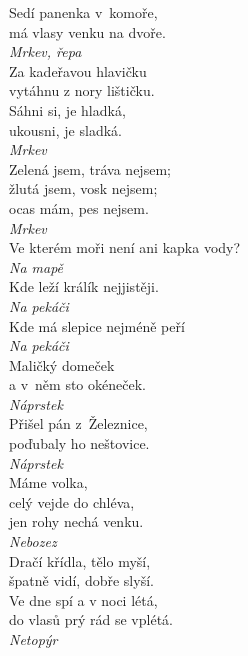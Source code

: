 \begin{multicols}{\value{columnsthindata}}
\noindent
Sedí panenka v~komoře,\\
má vlasy venku na dvoře.\\[1 mm]
{\sl Mrkev, řepa}\\

\noindent
Za kadeřavou hlavičku\\
vytáhnu z nory lištičku.\\
Sáhni si, je hladká,\\
ukousni, je sladká.\\[1 mm]
{\sl Mrkev}\\

\noindent
Zelená jsem, tráva nejsem;\\
žlutá jsem, vosk nejsem;\\
ocas mám, pes nejsem.\\[1 mm]
{\sl Mrkev}\\

\noindent
Ve kterém moři není ani kapka vody?\\[1 mm]
{\sl Na mapě}\\

\noindent
Kde leží králík nejjistěji.\\[1 mm]
{\sl Na pekáči}\\

\noindent
Kde má slepice nejméně peří\\[1 mm]
{\sl Na pekáči}\\

\noindent
Maličký domeček\\
a v~něm sto okéneček.\\[1 mm]
{\sl Náprstek}\\

\noindent
Přišel pán z~Železnice,\\
poďubaly ho neštovice.\\[1 mm]
{\sl Náprstek}\\

\noindent
Máme volka,\\
celý vejde do chléva,\\
jen rohy nechá venku.\\[1 mm]
{\sl Nebozez}\\

\noindent
Dračí křídla, tělo myší,\\
špatně vidí, dobře slyší.\\
Ve dne spí a v noci létá,\\
do vlasů prý rád se vplétá.\\[1 mm]
{\sl Netopýr}\\


\end{multicols}
